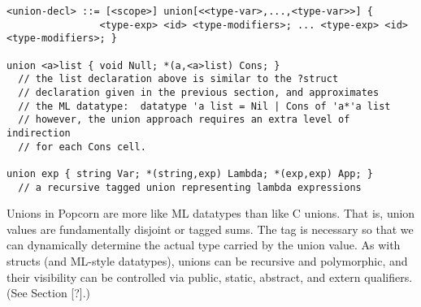 \documentclass[titlepage,10pt]{article}
\begin{document}

\begin{verbatim}
<union-decl> ::= [<scope>] union[<<type-var>,...,<type-var>>] {
                <type-exp> <id> <type-modifiers>; ... <type-exp> <id> <type-modifiers>; }

union <a>list { void Null; *(a,<a>list) Cons; }
  // the list declaration above is similar to the ?struct 
  // declaration given in the previous section, and approximates
  // the ML datatype:  datatype 'a list = Nil | Cons of 'a*'a list
  // however, the union approach requires an extra level of indirection
  // for each Cons cell.

union exp { string Var; *(string,exp) Lambda; *(exp,exp) App; }
  // a recursive tagged union representing lambda expressions
\end{verbatim}

Unions in Popcorn are more like ML datatypes than like C unions.   That
is, union values are fundamentally disjoint or tagged sums.  The tag is
necessary so that we can dynamically determine the actual type carried
by the union value.   As with structs (and ML-style datatypes), unions
can be recursive and polymorphic, and their visibility can be controlled
via public, static, abstract, and extern qualifiers.  (See Section [?].)
\end{document}

